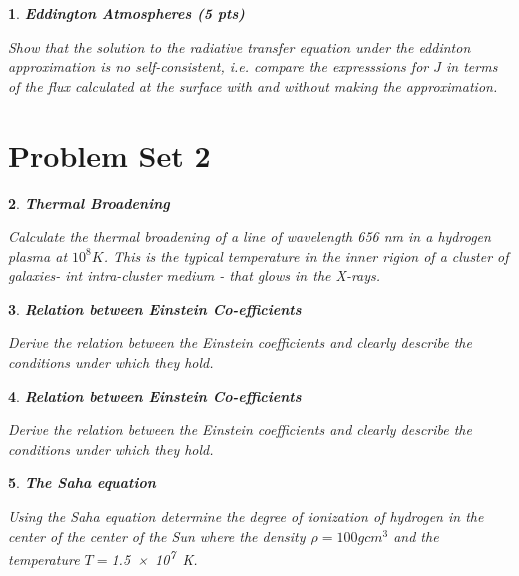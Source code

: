 \documentclass{article}
\newtheorem{p}{}[section]
\begin{document}
	\begin{p}
		\textbf{Eddington Atmospheres (5 pts)}

		\noindent
		Show that the solution to the radiative transfer equation under the eddinton approximation is no self-consistent, i.e. compare the expresssions for $J$ in terms of the flux calculated at the surface with and without making the approximation. 
	\end{p}
\newpage
\section{Problem Set 2}
	\begin{p}
		\textbf{Thermal Broadening}

		\noindent
		Calculate the thermal broadening of a line of wavelength 656 nm in  a hydrogen plasma at $10^8 K$. This is the typical temperature in the inner rigion of a cluster of galaxies- int intra-cluster medium - that glows in the X-rays. 
	\end{p}

	\begin{p}
		\textbf{Relation between Einstein Co-efficients}

		\noindent
		Derive the relation between the Einstein coefficients and clearly describe the conditions under which they hold.
	\end{p}

	\begin{p}
		\textbf{Relation between Einstein Co-efficients}

		\noindent
		Derive the relation between the Einstein coefficients and clearly describe the conditions under which they hold.
	\end{p}

	\begin{p}
		\textbf{The Saha equation}

		\noindent
		Using the Saha equation determine the degree of ionization of hydrogen in the center of the center of the Sun where the density $\rho = 100 g cm^3$ and the temperature $T=$\SI{1.5e7}{\kelvin}. 
	\end{p}
\end{document}
